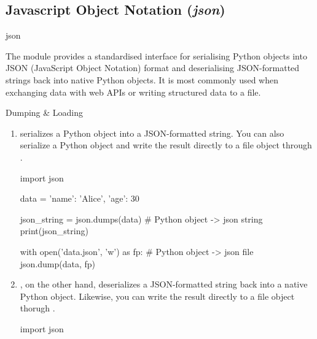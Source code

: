 \documentclass[10pt]{article}
\begin{document}
  \subsection{Javascript Object Notation (\textit{json})}

    \begin{core}{json}

      The  module provides a standardised interface for serialising Python objects into JSON (JavaScript Object Notation) format and deserialising JSON-formatted strings back into native Python objects. It is most commonly used when exchanging data with web APIs or writing structured data to a file.

    \end{core}

    \begin{core}{Dumping \& Loading}

      \begin{enumerate}

        \item {} serializes a Python object into a JSON-formatted string. You can also serialize a Python object and write the result directly to a file object  through .

        \begin{pyconsole}

          import json

          data = {'name': 'Alice', 'age': 30}

          json_string = json.dumps(data) # Python object -> json string
          print(json_string)

          with open('data.json', 'w') as fp: # Python object -> json file
              json.dump(data, fp)

        \end{pyconsole}

        \item {}, on the other hand, deserializes a JSON-formatted string back into a native Python object. Likewise, you can write the result directly to a file object  thorugh .

        \begin{pyconsole}

          import json


\end{pyconsole}
\end{enumerate}
\end{core}
\end{document}
